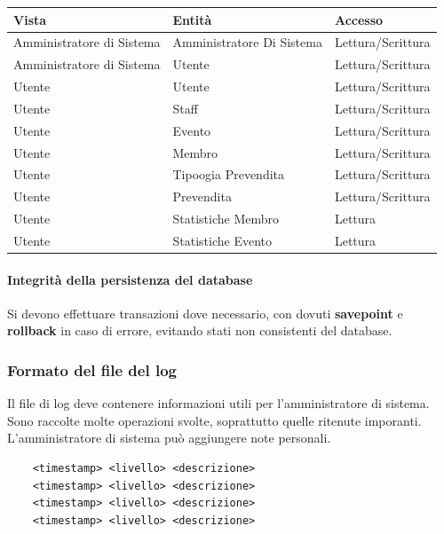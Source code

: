 \documentclass[a4paper]{article}
\begin{document}
\begin{center}
    \begin{tabularx}{1\textwidth}{|X|X|X|}
        \hline
        \textbf{Vista} & \textbf{Entità} & \textbf{Accesso}\\
        \hline
        \hline
        Amministratore di Sistema & Amministratore Di Sistema & Lettura/Scrittura\\
        Amministratore di Sistema & Utente & Lettura/Scrittura\\
        Utente & Utente & Lettura/Scrittura\\
        Utente & Staff & Lettura/Scrittura\\
        Utente & Evento & Lettura/Scrittura\\
        Utente & Membro & Lettura/Scrittura\\
        Utente & Tipoogia Prevendita & Lettura/Scrittura\\
        Utente & Prevendita & Lettura/Scrittura\\
        Utente & Statistiche Membro & Lettura\\
        Utente & Statistiche Evento & Lettura\\
        \hline
    \end{tabularx}
\end{center}

\paragraph{Integrità della persistenza del database} Si devono effettuare transazioni dove necessario, con dovuti \textbf{savepoint} e \textbf{rollback} in caso di errore, evitando stati non consistenti del database.

\subsubsection{Formato del file del log}

Il file di log deve contenere informazioni utili per l'amministratore di sistema. Sono raccolte molte operazioni svolte, soprattutto quelle ritenute imporanti. L'amministratore di sistema può aggiungere note personali.

\begin{lstlisting}
    <timestamp> <livello> <descrizione>
    <timestamp> <livello> <descrizione>
    <timestamp> <livello> <descrizione>
    <timestamp> <livello> <descrizione>
\end{lstlisting}
\end{document}
